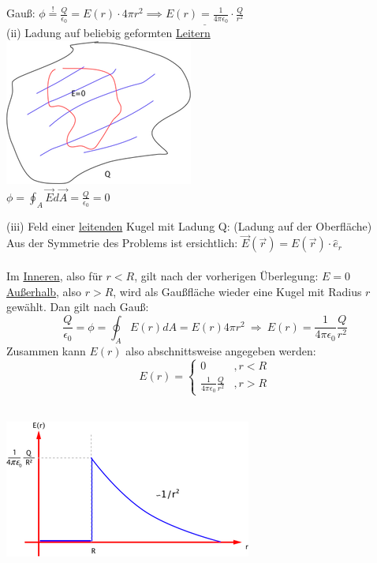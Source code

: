 \documentclass[11pt]{article}
\begin{document}
Gau\ss{}: $\phi\overset{!}{=} \frac{Q}{\epsilon_0}=E(r)\cdot4\pi r^2 \implies \underline{E(r)=\frac{1}{4\pi\epsilon_0}\cdot\frac{Q}{r^2}}$\\

(ii) Ladung auf beliebig geformten \underline{Leitern}\\

\includegraphics{skizzen/14/14_6B3}\\

$\phi=\oint_{A}\vec{E}d\vec{A}=\frac{Q}{\epsilon_0}=0$\\
\newpage

(iii) Feld einer \underline{leitenden} Kugel mit Ladung Q: (Ladung auf der Oberfläche)\\

Aus der Symmetrie des Problems ist ersichtlich:
$ \vec{E}(\vec{r})= E(\vec{r})\cdot\hat{e}_r $\\
\\
Im \underline{Inneren}, also für $r<R$, gilt nach der vorherigen Überlegung: $E=0$\\
\underline{Au\ss{}erhalb}, also $r>R$, wird als Gau\ss{}fläche wieder eine Kugel mit Radius $r$ gewählt. Dan  gilt nach Gau\ss{}:
$$\frac{Q}{\epsilon_0}=\phi=\oint_AE(r)dA=E(r)4\pi r^2\ \Rightarrow\ E(r)=\frac{1}{4\pi\epsilon_0}\frac{Q}{r^2}$$
Zusammen kann $E(r)$ also abschnittsweise angegeben werden:
\[
     E(r)=\left\{\begin{array}{ll} 0 & ,r<R \\
         \frac{1}{4\pi\epsilon_0}\frac{Q}{r^2} & ,r>R\end{array}\right.
  \]

\hfill\\

\includegraphics{skizzen/14/14_6B5}\\
\end{document}
